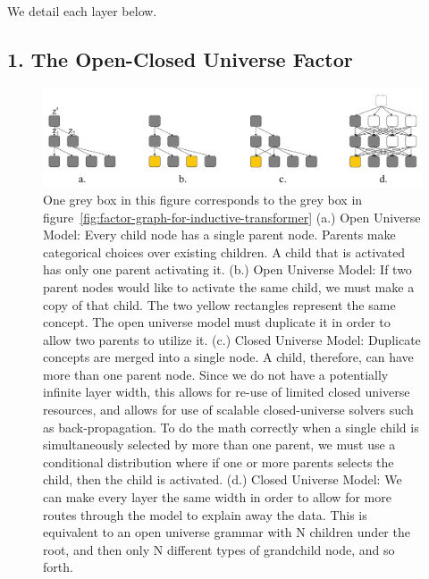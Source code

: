 \documentclass{article}
\begin{document}
We detail each layer below.

\subsection{1. The Open-Closed Universe Factor}\label{section:open-closed-universe}
 
\begin{figure}[H]
    \centering
    \includegraphics[width=\textwidth]{figures/from-open-universe-to-closed-universe.pdf}
    \caption{One grey box in this figure corresponds to the grey box in figure~\ref{fig:factor-graph-for-inductive-transformer} (a.) Open Universe Model: Every child node has a single parent node.  Parents make categorical choices over existing children.  A child that is activated has only one parent activating it. (b.) Open Universe Model: If two parent nodes would like to activate the same child, we must make a copy of that child.  The two yellow rectangles represent the same concept.  The open universe model must duplicate it in order to allow two parents to utilize it.  (c.) Closed Universe Model: Duplicate concepts are merged into a single node.  A child, therefore, can have more than one parent node.  Since we do not have a potentially infinite layer width, this allows for re-use of limited closed universe resources, and allows for use of scalable closed-universe solvers such as back-propagation.  To do the math correctly when a single child is simultaneously selected by more than one parent, we must use a conditional distribution where if one or more parents selects the child, then the child is activated. (d.) Closed Universe Model: We can make every layer the same width in order to allow for more routes through the model to explain away the data.  This is equivalent to an open universe grammar with N children under the root, and then only N different types of grandchild node, and so forth.}
    \label{fig-appendix:from-open-universe-to-closed-universe}
\end{figure}
\end{document}
